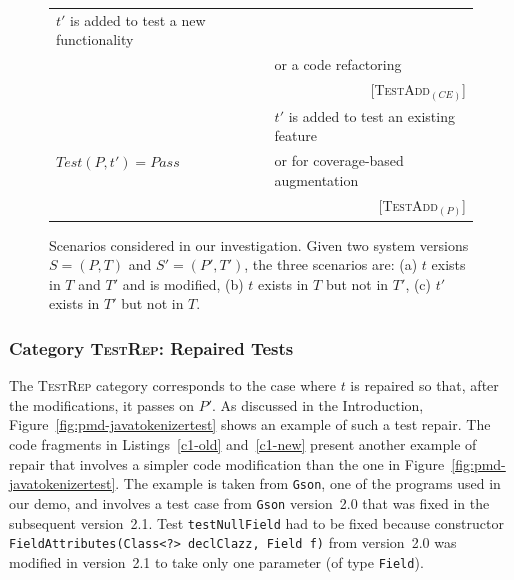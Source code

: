 \documentclass[conference]{IEEEtran}
\newcommand{\lang}[1]{\texttt{\small #1}}
\newcommand{\subject}[1]{\texttt{\small #1}}
\newcommand{\mt}{\mathit}
\newcommand{\pass}{\mt{Pass}}
\newcommand{\testfunc}[2]{\mt{Test(#1, #2)}}
\newcommand{\catrep}{\textsc{TestRep}}
\newcommand{\cataddce}{\textsc{TestAdd}$_\mt{(CE)}$}
\newcommand{\cataddp}{\textsc{TestAdd}$_\mt{(P)}$}
\begin{document}
\begin{figure}[t]
\begin{tabular}{|l||l|}
  $t'$ is added to test a new functionality \\
  & or a code refactoring \\
  & \multicolumn{1}{r|}{\scriptsize [\cataddce{}]} \\
  \hline
  \multirow{3}{*}{$\testfunc{P}{t'} = \pass$} &
  $t'$ is added to test an existing feature\\
  & or for coverage-based augmentation \\
  & \multicolumn{1}{r|}{\scriptsize [\cataddp{}]} \\
  \hline
\end{tabular}
\caption{Scenarios considered in our investigation. Given two system
  versions $S = (P, T)$ and $S' = (P', T')$, the three scenarios are:
  (a) $t$ exists in $T$ and $T'$ and is modified, (b) $t$ exists in
  $T$ but not in $T'$, (c) $t'$ exists in $T'$ but not in $T$.}
\vspace*{-5pt}
\label{fig:study-design}
\end{figure}

\subsubsection{Category \catrep{}: Repaired Tests}
\label{sec:category-rep}

The \catrep{} category corresponds to the case where $t$ is repaired
so that, after the modifications, it passes on $P'.$ As discussed in
the Introduction, Figure~\ref{fig:pmd-javatokenizertest} shows an
example of such a test repair. The code fragments in
Listings~\ref{c1-old} and~\ref{c1-new} present another example of
repair that involves a simpler code modification than the one in
Figure~\ref{fig:pmd-javatokenizertest}. The example is taken from
\subject{Gson}, one of the programs used in our demo, and involves a
test case from \subject{Gson} version~2.0 that was fixed in the
subsequent version~2.1. Test \lang{testNullField} had to be fixed
because constructor \lang{FieldAttributes(Class<?> declClazz, Field
  f)} from version~2.0 was modified in version~2.1 to take only one
parameter (of type \lang{Field}).

\vspace*{-10pt}

\end{document}
